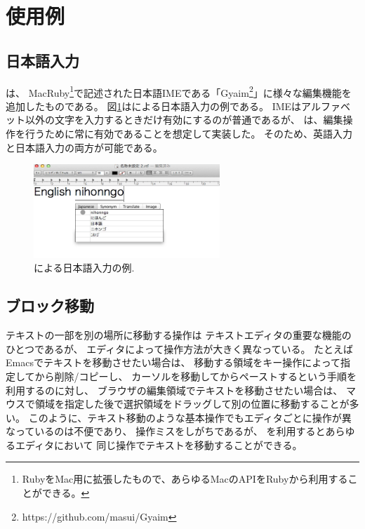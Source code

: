 \section{{\system}使用例}


\subsection{日本語入力}

{\system}は、
MacRuby\footnote{
  RubyをMac用に拡張したもので、あらゆるMacのAPIをRubyから利用することができる。
}で記述された日本語IMEである「Gyaim\footnote{
 \textsf{https://github.com/masui/Gyaim}
}」に様々な編集機能を追加したものである。
%
図\ref{japaneseinput}は{\system}による日本語入力の例である。
IMEはアルファベット以外の文字を入力するときだけ有効にするのが普通であるが、
{\system}は、編集操作を行うために常に有効であることを想定して実装した。
そのため、英語入力と日本語入力の両方が可能である。

\begin{figure}[H]
\centerline{\includegraphics[width=70mm,bb=0 0 600 320]{figures/japanese.png}}
\caption{{\system}による日本語入力の例.}
\label{japaneseinput}
\end{figure}

\subsection{ブロック移動}

テキストの一部を別の場所に移動する操作は
テキストエディタの重要な機能のひとつであるが、
エディタによって操作方法が大きく異なっている。
たとえばEmacsでテキストを移動させたい場合は、
移動する領域をキー操作によって指定してから削除/コピーし、
カーソルを移動してからペーストするという手順を利用するのに対し、
ブラウザの編集領域でテキストを移動させたい場合は、
マウスで領域を指定した後で選択領域をドラッグして別の位置に移動することが多い。
このように、テキスト移動のような基本操作でもエディタごとに操作が異なっているのは不便であり、
操作ミスをしがちであるが、
{\system}を利用するとあらゆるエディタにおいて
同じ操作でテキストを移動することができる。

